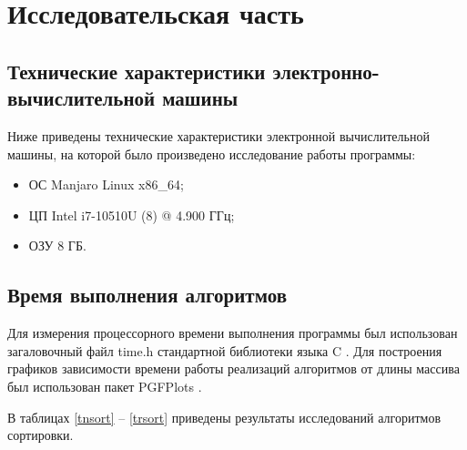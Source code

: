 \chapter{Исследовательская часть}

\section{Технические характеристики электронно-вычислительной машины}

Ниже приведены технические характеристики электронной вычислительной машины, на которой было произведено исследование работы программы:

\begin{itemize}
	\item ОС Manjaro Linux x86\_64;
	\item ЦП Intel i7-10510U (8) @ 4.900 ГГц;
	\item ОЗУ 8 ГБ.
\end{itemize}

\section{Время выполнения алгоритмов}

Для измерения процессорного времени выполнения программы был использован загаловочный файл time.h стандартной библиотеки языка C \cite{timeh}. Для построения графиков зависимости времени работы реализаций алгоритмов от длины массива был использован пакет PGFPlots \cite{pgfp}.

В таблицах \ref{tnsort} -- \ref{trsort} приведены результаты исследований алгоритмов сортировки.

